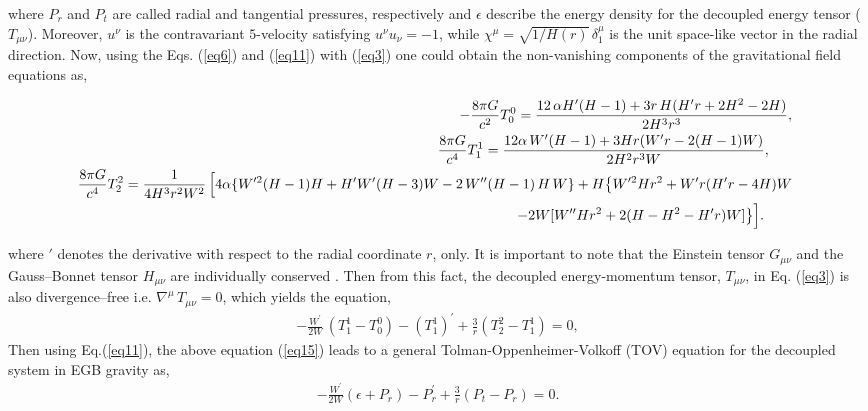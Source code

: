 \documentclass[]{aastex631}
\begin{document}
where $P_r$ and $P_{t}$ are called radial and tangential pressures, respectively and $\epsilon$ describe the energy density for the  decoupled energy tensor ($T_{\mu\nu}$). Moreover, $u^{\nu}$ is the contravariant $5$-velocity satisfying $u^{\nu} u_{\nu}=-1$,  while $\chi^\mu=\sqrt{1/H(r)}\,\delta^\mu_1$ is the unit space-like vector in the radial direction. 
Now, using the Eqs. (\ref{eq6}) and (\ref{eq11}) with (\ref{eq3}) one could obtain the non-vanishing components of the gravitational field equations as,
\begin{small}
\begin{eqnarray}
&&\hspace{-0.5cm} -\frac{8\pi G }{c^2} T^0_0  = \frac{12\, \alpha H^\prime (H-1) +3r\, H (H^\prime r + 2 H^2-2H )}{2 H^3 r^3},  \label{eq12} \\
&& \hspace{-0.5cm}  \frac{8\pi G }{c^4}  T^1_1 =\frac{12 \alpha\, W^\prime (H-1) +3 H r (W^\prime r - 2 (H-1) W)}{2 H^2 r^3 W},~~~~~ \label{eq13}\\
&&\hspace{-0.5cm}  \frac{8\pi G }{c^4}  T^2_2  = \frac{1}{4 H^3 r^2 W^2}\,\Big[4 \alpha \{W^{\prime 2} (H-1) H + H^\prime W^\prime (H-3) W   - 2\, W^{\prime\prime} (H-1)\, H\, W\}  + H \big\{W^{\prime 2} H r^2 + W^\prime r (H^\prime r  -4 H ) W  \nonumber\\ && \hspace{0.8 cm} - 2 W [W^{\prime\prime} H r^2 + 2 (H - H^2 - H^\prime r) W]\big\} \Big].  \label{eq14} ~~~~~~
\end{eqnarray}
\end{small}
where $\prime$ denotes the derivative with respect to the radial coordinate $r$, only. It is important to note that the Einstein tensor $G_{\mu\nu}$ and the 
Gauss--Bonnet tensor $H_{\mu\nu}$ are individually conserved \citep{love1,love2}. Then from this fact, the decoupled  
energy-momentum tensor, $T_{\mu\nu}$, in Eq. (\ref{eq3})  is also divergence--free i.e. $\nabla^\mu\,T_{\mu\nu}=0$, which yields the equation,
\begin{eqnarray}
-\frac{W^\prime}{2W}\,({T}^1_1-{T}^0_0)-({T}^1_1)^\prime+\frac{3}{r}({T}^2_2-{T}^1_1)=0,  \label{eq15}
\end{eqnarray}
Then using Eq.(\ref{eq11}), the above equation (\ref{eq15}) leads to a general Tolman-Oppenheimer-Volkoff (TOV) equation for the decoupled system in EGB gravity as,  
\begin{eqnarray}
-\frac{W^\prime}{2W}(\epsilon+P_r)-P_r^{\prime}+\frac{3}{r}( P_{t}-P_r)=0.\label{eq16}
\end{eqnarray}
\end{document}
